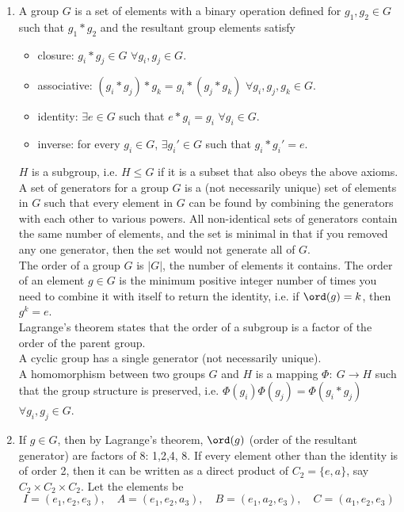 \documentclass[a4paper]{article}
\begin{document}
\begin{ans}\leavevmode
\begin{enumerate}[label=(\alph*)]
\item A group $G$ is a set of elements with a binary operation defined for $g_1,g_2\in G$ such that $g_1*g_2$ and the resultant group elements satisfy
\begin{itemize}
    \item closure: $g_i*g_j\in G$ $\forall g_i,g_j\in G$.
    \item associative: $(g_i*g_j)*g_k=g_i*(g_j*g_k)$ $\forall g_i,g_j,g_k\in G$.
    \item identity: $\exists e\in G$ such that $e*g_i=g_i$ $\forall g_i\in G$.
    \item inverse: for every $g_i\in G$, $\exists g_i'\in G$ such that $g_i*g_i'=e$.
\end{itemize}
$H$ is a subgroup, i.e. $H\leq G$ if it is a subset that also obeys the above axioms.\\[5pt]
A set of generators for a group $G$ is a (not necessarily unique) set of elements in $G$ such that every element in $G$ can be found by combining the generators with each other to various powers. All non-identical sets of generators contain the same number of elements, and the set is minimal in that if you removed any one generator, then the set would not generate all of $G$.\\[5pt]
The order of a group $G$ is $|G|$, the number of elements it contains. The order of an element $g\in G$ is the minimum positive integer number of times you need to combine it with itself to return the identity, i.e. if $\ord(g)=k$, then $g^k=e$.\\[5pt]
Lagrange's theorem states that the order of a subgroup is a factor of the order of the parent group.\\[5pt]
A cyclic group has a single generator (not necessarily unique).\\[5pt]
A homomorphism between two groups $G$ and $H$ is a mapping $\Phi:~G\rightarrow H$ such that the group structure is preserved, i.e. $\Phi(g_i)\Phi(g_j)=\Phi(g_i*g_j)$ $\forall g_i,g_j\in G$.
\item If $g\in G$, then by Lagrange's theorem, $\ord(g)$ (order of the resultant generator) are factors of 8: 1,2,4, 8. If every element other than the identity is of order 2, then it can be written as a direct product of $C_2=\{e,a\}$, say $C_2\times C_2\times C_2$. Let the elements be
$$I=(e_1,e_2,e_3),\quad A=(e_1,e_2,a_3),\quad B=(e_1,a_2,e_3),\quad C=(a_1,e_2,e_3)$$

\end{enumerate}
\end{ans}
\end{document}
